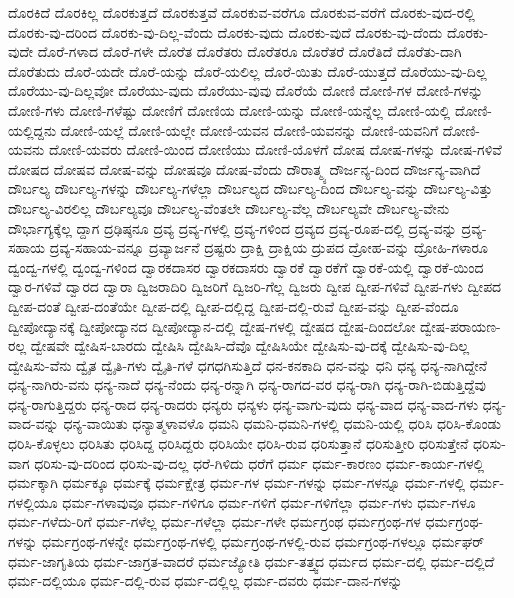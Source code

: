 {ದೊರಕಿದೆ
ದೊರಕಿಲ್ಲ
ದೊರಕುತ್ತದೆ
ದೊರಕುತ್ತವೆ
ದೊರಕುವ-ವರೆಗೂ
ದೊರಕುವ-ವರೆಗೆ
ದೊರಕು-ವುದ-ರಲ್ಲಿ
ದೊರಕು-ವು-ದರಿಂದ
ದೊರಕು-ವು-ದಿಲ್ಲ-ವೆಂದು
ದೊರಕು-ವುದು
ದೊರಕು-ವುದೆ
ದೊರಕು-ವು-ದೆಂದು
ದೊರಕು-ವುದೇ
ದೊರೆ-ಗಳಾದ
ದೊರೆ-ಗಳೇ
ದೊರೆತ
ದೊರೆತರು
ದೊರೆತರೂ
ದೊರೆತರೆ
ದೊರೆತಿದೆ
ದೊರೆತು-ದಾಗಿ
ದೊರೆತುದು
ದೊರೆ-ಯದೇ
ದೊರೆ-ಯನ್ನು
ದೊರೆ-ಯಲಿಲ್ಲ
ದೊರೆ-ಯಿತು
ದೊರೆ-ಯುತ್ತದೆ
ದೊರೆಯು-ವು-ದಿಲ್ಲ
ದೊರೆಯು-ವು-ದಿಲ್ಲವೋ
ದೊರೆಯು-ವುದು
ದೊರೆಯು-ವುವು
ದೊರೆಯೆ
ದೋಣಿ
ದೋಣಿ-ಗಳ
ದೋಣಿ-ಗಳನ್ನು
ದೋಣಿ-ಗಳು
ದೋಣಿ-ಗಳೆಷ್ಟು
ದೋಣಿಗೆ
ದೋಣಿಯ
ದೋಣಿ-ಯನ್ನು
ದೋಣಿ-ಯನ್ನೆಲ್ಲ
ದೋಣಿ-ಯಲ್ಲಿ
ದೋಣಿ-ಯಲ್ಲಿದ್ದನು
ದೋಣಿ-ಯಲ್ಲೆ
ದೋಣಿ-ಯಲ್ಲೇ
ದೋಣಿ-ಯವನ
ದೋಣಿ-ಯವನನ್ನು
ದೋಣಿ-ಯವನಿಗೆ
ದೋಣಿ-ಯವನು
ದೋಣಿ-ಯವರು
ದೋಣಿ-ಯಿಂದ
ದೋಣಿಯು
ದೋಣಿ-ಯೊಳಗೆ
ದೋಷ
ದೋಷ-ಗಳನ್ನು
ದೋಷ-ಗಳಿವೆ
ದೋಷದ
ದೋಷವ
ದೋಷ-ವನ್ನು
ದೋಷವೂ
ದೋಷ-ವೆಂದು
ದೌರಾತ್ಮ್ಯ
ದೌರ್ಜನ್ಯ-ದಿಂದ
ದೌರ್ಜನ್ಯ-ವಾಗಿದೆ
ದೌರ್ಬಲ್ಯ
ದೌರ್ಬಲ್ಯ-ಗಳನ್ನು
ದೌರ್ಬಲ್ಯ-ಗಳೆಲ್ಲಾ
ದೌರ್ಬಲ್ಯದ
ದೌರ್ಬಲ್ಯ-ದಿಂದ
ದೌರ್ಬಲ್ಯ-ವನ್ನು
ದೌರ್ಬಲ್ಯ-ವಿತ್ತು
ದೌರ್ಬಲ್ಯ-ವಿರಲಿಲ್ಲ
ದೌರ್ಬಲ್ಯವೂ
ದೌರ್ಬಲ್ಯ-ವೆಂತಲೇ
ದೌರ್ಬಲ್ಯ-ವೆಲ್ಲ
ದೌರ್ಬಲ್ಯವೇ
ದೌರ್ಬಲ್ಯ-ವೇನು
ದೌರ್ಭಾಗ್ಯಕ್ಕೆಲ್ಲ
ದ್ದಾಗ
ದ್ರಢಿಷ್ಠನೂ
ದ್ರವ್ಯ
ದ್ರವ್ಯ-ಗಳಲ್ಲಿ
ದ್ರವ್ಯ-ಗಳಿಂದ
ದ್ರವ್ಯದ
ದ್ರವ್ಯ-ರೂಪ-ದಲ್ಲಿ
ದ್ರವ್ಯ-ವನ್ನು
ದ್ರವ್ಯ-ಸಹಾಯ
ದ್ರವ್ಯ-ಸಹಾಯ-ವನ್ನೂ
ದ್ರವ್ಯಾರ್ಜನೆ
ದ್ರಷ್ಟರು
ದ್ರಾಕ್ಷಿ
ದ್ರಾಕ್ಷಿಯ
ದ್ರುಪದ
ದ್ರೋಹ-ವನ್ನು
ದ್ರೋಹಿ-ಗಳಾರೂ
ದ್ವಂದ್ವ-ಗಳಲ್ಲಿ
ದ್ವಂದ್ವ-ಗಳಿಂದ
ದ್ವಾರಕದಾಸರ
ದ್ವಾರಕದಾಸರು
ದ್ವಾರಕೆ
ದ್ವಾರಕೆಗೆ
ದ್ವಾರಕೆ-ಯಲ್ಲಿ
ದ್ವಾರಕೆ-ಯಿಂದ
ದ್ವಾರ-ಗಳಿವೆ
ದ್ವಾರದ
ದ್ವಾರಾ
ದ್ವಿಜರಾದಿರಿ
ದ್ವಿಜರಿಗೆ
ದ್ವಿಜರಿ-ಗೆಲ್ಲ
ದ್ವಿಜರು
ದ್ವೀಪ
ದ್ವೀಪ-ಗಳಿವೆ
ದ್ವೀಪ-ಗಳು
ದ್ವೀಪದ
ದ್ವೀಪ-ದಂತೆ
ದ್ವೀಪ-ದಂತೆಯೇ
ದ್ವೀಪ-ದಲ್ಲಿ
ದ್ವೀಪ-ದಲ್ಲಿದ್ದ
ದ್ವೀಪ-ದಲ್ಲಿ-ರುವೆ
ದ್ವೀಪ-ವನ್ನು
ದ್ವೀಪ-ವೆಂದೂ
ದ್ವೀಪೋದ್ಯಾನಕ್ಕೆ
ದ್ವೀಪೋದ್ಯಾನದ
ದ್ವೀಪೋದ್ಯಾನ-ದಲ್ಲಿ
ದ್ವೇಷ-ಗಳಲ್ಲಿ
ದ್ವೇಷದ
ದ್ವೇಷ-ದಿಂದಲೋ
ದ್ವೇಷ-ಪರಾಯಣ-ರಲ್ಲ
ದ್ವೇಷವೇ
ದ್ವೇಷಿಸ-ಬಾರದು
ದ್ವೇಷಿಸಿ
ದ್ವೇಷಿಸಿ-ದೆವೊ
ದ್ವೇಷಿಸಿಯೇ
ದ್ವೇಷಿಸು-ವು-ದಕ್ಕೆ
ದ್ವೇಷಿಸು-ವು-ದಿಲ್ಲ
ದ್ವೇಷಿಸು-ವೆನು
ದ್ವೈತ
ದ್ವೈತಿ-ಗಳು
ದ್ವೈತಿ-ಗಳೆ
ಧಗಧಗಿಸುತ್ತಿದೆ
ಧನ-ಕನಕಾದಿ
ಧನ-ವನ್ನು
ಧನಿ
ಧನ್ಯ
ಧನ್ಯ-ನಾಗಿದ್ದೇನೆ
ಧನ್ಯ-ನಾಗಿರು-ವನು
ಧನ್ಯ-ನಾದೆ
ಧನ್ಯ-ನೆಂದು
ಧನ್ಯ-ರನ್ನಾಗಿ
ಧನ್ಯ-ರಾಗದ-ವರ
ಧನ್ಯ-ರಾಗಿ
ಧನ್ಯ-ರಾಗಿ-ಬಿಡುತ್ತಿದ್ದೆವು
ಧನ್ಯ-ರಾಗುತ್ತಿದ್ದರು
ಧನ್ಯ-ರಾದ
ಧನ್ಯ-ರಾದರು
ಧನ್ಯರು
ಧನ್ಯಳು
ಧನ್ಯ-ವಾಗು-ವುದು
ಧನ್ಯ-ವಾದ
ಧನ್ಯ-ವಾದ-ಗಳು
ಧನ್ಯ-ವಾದ-ವನ್ನು
ಧನ್ಯ-ವಾಯಿತು
ಧನ್ಯಾತ್ಮಳಾವಳೊ
ಧಮನಿ
ಧಮನಿ-ಧಮನಿ-ಗಳಲ್ಲಿ
ಧಮನಿ-ಯಲ್ಲಿ
ಧರಿಸಿ
ಧರಿಸಿ-ಕೊಂಡು
ಧರಿಸಿ-ಕೊಳ್ಳಲು
ಧರಿಸಿತು
ಧರಿಸಿದ್ದ
ಧರಿಸಿದ್ದರು
ಧರಿಸಿಯೇ
ಧರಿಸಿ-ರುವ
ಧರಿಸುತ್ತಾನೆ
ಧರಿಸುತ್ತೀರಿ
ಧರಿಸುತ್ತೇನೆ
ಧರಿಸು-ವಾಗ
ಧರಿಸು-ವು-ದರಿಂದ
ಧರಿಸು-ವು-ದಲ್ಲ
ಧರೆ-ಗಿಳಿದು
ಧರೆಗೆ
ಧರ್ಮ
ಧರ್ಮ-ಕಾರಣಂ
ಧರ್ಮ-ಕಾರ್ಯ-ಗಳಲ್ಲಿ
ಧರ್ಮಕ್ಕಾಗಿ
ಧರ್ಮಕ್ಕೂ
ಧರ್ಮಕ್ಕೆ
ಧರ್ಮಕ್ಷೇತ್ರ
ಧರ್ಮ-ಗಳ
ಧರ್ಮ-ಗಳನ್ನು
ಧರ್ಮ-ಗಳನ್ನೂ
ಧರ್ಮ-ಗಳಲ್ಲಿ
ಧರ್ಮ-ಗಳಲ್ಲಿಯೂ
ಧರ್ಮ-ಗಳಾವುವೂ
ಧರ್ಮ-ಗಳಿಗೂ
ಧರ್ಮ-ಗಳಿಗೆ
ಧರ್ಮ-ಗಳಿಗೆಲ್ಲಾ
ಧರ್ಮ-ಗಳು
ಧರ್ಮ-ಗಳೂ
ಧರ್ಮ-ಗಳೆದು-ರಿಗೆ
ಧರ್ಮ-ಗಳೆಲ್ಲ
ಧರ್ಮ-ಗಳೆಲ್ಲಾ
ಧರ್ಮ-ಗಳೇ
ಧರ್ಮಗ್ರಂಥ
ಧರ್ಮಗ್ರಂಥ-ಗಳ
ಧರ್ಮಗ್ರಂಥ-ಗಳನ್ನು
ಧರ್ಮಗ್ರಂಥ-ಗಳನ್ನೇ
ಧರ್ಮಗ್ರಂಥ-ಗಳಲ್ಲಿ
ಧರ್ಮಗ್ರಂಥ-ಗಳಲ್ಲಿ-ರುವ
ಧರ್ಮಗ್ರಂಥ-ಗಳಲ್ಲೂ
ಧರ್ಮಘರ್
ಧರ್ಮ-ಜಾಗೃತಿಯ
ಧರ್ಮ-ಜಾಗ್ರತ-ವಾದರೆ
ಧರ್ಮಜ್ಯೋತಿ
ಧರ್ಮ-ತತ್ತ್ವದ
ಧರ್ಮದ
ಧರ್ಮ-ದಲ್ಲಿ
ಧರ್ಮ-ದಲ್ಲಿದೆ
ಧರ್ಮ-ದಲ್ಲಿಯೂ
ಧರ್ಮ-ದಲ್ಲಿ-ರುವ
ಧರ್ಮ-ದಲ್ಲಿಲ್ಲ
ಧರ್ಮ-ದವರು
ಧರ್ಮ-ದಾನ-ಗಳನ್ನು
}

